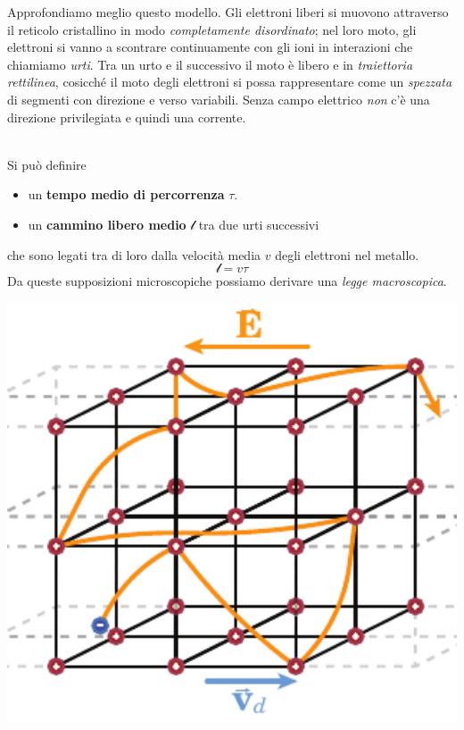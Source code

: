 \begin{minipage}{0.61\textwidth}
	Approfondiamo meglio questo modello. Gli elettroni liberi si muovono attraverso il reticolo cristallino in modo \textit{completamente disordinato}; nel loro moto, gli elettroni si vanno a scontrare continuamente con gli ioni in interazioni che chiamiamo \textit{urti}. Tra un urto e il successivo il moto è libero e in \textit{traiettoria rettilinea}, cosicché il moto degli elettroni si possa rappresentare come un \textit{spezzata} di segmenti con direzione e verso variabili. Senza campo elettrico \textit{non} c'è una direzione privilegiata e quindi una corrente.
\end{minipage}\\
Si può definire
\begin{itemize}
	\item un \textbf{tempo medio di percorrenza} $\tau$.
	\item un \textbf{cammino libero medio} $\mathcal{l}$ tra due urti successivi
\end{itemize}
che sono legati tra di loro dalla velocità media $v$ degli elettroni nel metallo.
\begin{equation}
	\mathcal{l}=v\tau
\end{equation}
Da queste supposizioni microscopiche possiamo derivare una \textit{legge macroscopica}.\\
\begin{minipage}{0.38\textwidth}
	\begin{center}
		\includegraphics[width=1\textwidth]{images/chp5/chp5reticolocristallinoacc.pdf}
	\end{center}
\end{minipage}\hspace{5pt}
